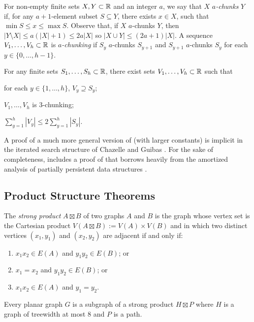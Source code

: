 \documentclass[kpfonts]{patmorin}
\let\le\leqslant
\begin{document}
For non-empty finite sets $X,Y\subset \mathbb{R}$ and an integer $a$, we say that $X$ \emph{$a$-chunks} $Y$ if, for any $a+1$-element subset $S\subseteq Y$, there exists $x\in X$, such that $\min S\le x\le \max S$. Observe that, if $X$ $a$-chunks $Y$, then $|Y\setminus X|\le a(|X|+1)\le 2a|X|$ so $|X\cup Y|\le (2a+1)|X|$.  A sequence $V_1,\dots,V_h\subset\mathbb{R}$ is \emph{$a$-chunking} if $S_y$ $a$-chunks $S_{y+1}$ and $S_{y+1}$ $a$-chunks $S_y$ for each $y\in\{0,\ldots,h-1\}$.

\begin{lem}
  For any finite sets $S_1,\ldots,S_h\subset\mathbb{R}$, there exist sets $V_1,\ldots,V_{h}\subset\mathbb{R}$ such that
  \begin{compactenum}
    \item for each $y\in\{1,\ldots,h\}$, $V_y\supseteq S_y$;
    \item $V_1,\ldots,V_h$ is $3$-chunking;
    \item $\sum_{y=1}^h |V_y|\le 2\sum_{y=1}^h |S_y|$.
  \end{compactenum}
\end{lem}

A proof of a much more general version of  (with larger constants) is implicit in the iterated search structure of Chazelle and Guibas \cite{chazelle.guibas:fractional1}.   For the sake of completeness,  includes a proof of  that borrows heavily from the amortized analysis of partially persistent data structures \cite[Section~2.3]{driscoll.sarnak.ea:making}.


\subsection{Product Structure Theorems}

The \emph{strong product} $A\boxtimes B$ of two graphs $A$ and $B$ is the graph whose vertex set is the Cartesian product $V(A\boxtimes B):=V(A)\times V(B)$ and in which two distinct vertices $(x_1,y_1)$ and $(x_2,y_2)$ are adjacent if and only if:
\begin{enumerate}
  \item  $x_1x_2 \in E(A)$ and $y_1y_2 \in E(B)$; or
  \item $x_1=x_2$ and $y_1y_2\in E(B)$; or
  \item $x_1x_2 \in E(A)$ and $y_1=y_2$.
\end{enumerate}

\begin{thm}
  Every planar graph $G$ is a subgraph of a strong product $H\boxtimes P$ where $H$ is a graph of treewidth at most 8 and $P$ is a path.
\end{thm}
\end{document}
